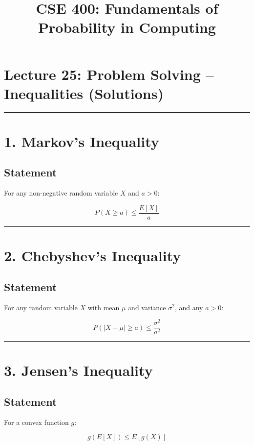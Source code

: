 \documentclass[11pt]{article}
\begin{document}
\title{CSE 400: Fundamentals of Probability in Computing}
\author{}
\date{}
\maketitle

\section*{Lecture 25: Problem Solving – Inequalities (Solutions)}

\hrule

\section*{1. Markov’s Inequality}

\subsection*{Statement}

For any non-negative random variable $X$ and $a > 0$:

\[
P(X \ge a) \le \frac{E[X]}{a}
\]

\hrule

\section*{2. Chebyshev’s Inequality}

\subsection*{Statement}

For any random variable $X$ with mean $\mu$ and variance $\sigma^2$, and any $a > 0$:

\[
P(|X - \mu| \ge a) \le \frac{\sigma^2}{a^2}
\]

\hrule

\section*{3. Jensen’s Inequality}

\subsection*{Statement}

For a convex function $g$:

\[
g(E[X]) \le E[g(X)]
\]
\end{document}
